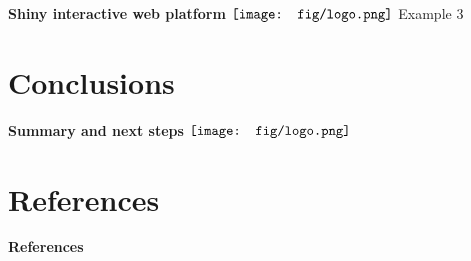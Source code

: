 \documentclass{beamer}
\begin{document}
\begin{frame}{\textbf{Shiny interactive web platform} \hspace{0pt plus 1 filll} $\vcenter{\hbox{\texttt{[image: fig/logo.png]}}}$}
Example 3
\end{frame}

\section{Conclusions}

\begin{frame}{\textbf{Summary and next steps} \hspace{0pt plus 1 filll} $\vcenter{\hbox{\texttt{[image: fig/logo.png]}}}$}

\end{frame}


\section{References}

\begin{frame}[t]{\textbf{References}}
\tiny
{}


\end{frame}
\end{document}
